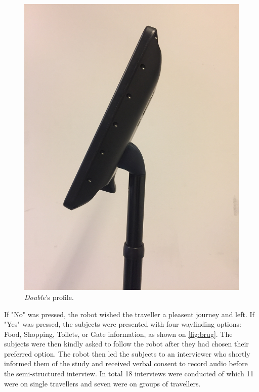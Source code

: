 \begin{figure}[H]
\begin{minipage}{.25\textwidth}
  \centering
  \includegraphics[width=\linewidth, angle =-90]{Figure/ModificeretDoubleSideClose}
  \caption{\textit{Double}'s profile.}
  \label{fig:ModificeretDoubleSideClose}
\end{minipage}
\end{figure}
\noindent
%
If "No" was pressed, the robot wished the traveller a pleasent journey and left. If "Yes" was pressed, the subjects were presented with four wayfinding options: Food, Shopping, Toilets, or Gate information, as shown on \autoref{fig:brug}. The subjects were then kindly asked to follow the robot after they had chosen their preferred option. The robot then led the subjects to an interviewer who shortly informed them of the study and received verbal consent to record audio before the semi-structured interview. In total 18 interviews were conducted of which 11 were on single travellers and seven were on groups of travellers.
%
